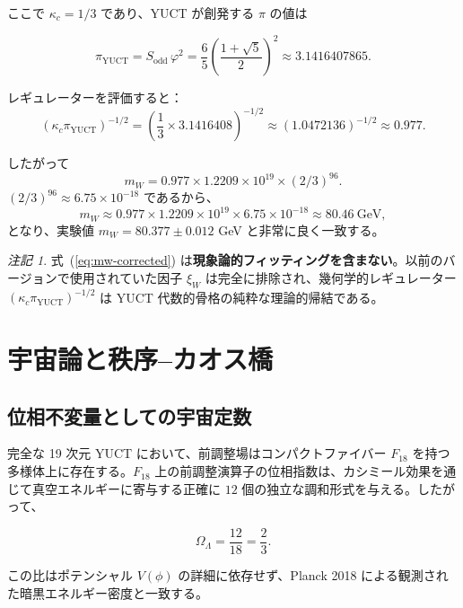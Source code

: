 \documentclass[12pt,a4paper]{article}
\theoremstyle{remark}
\newtheorem{remark}[theorem]{注記}
\begin{document}
	ここで \(\kappa_c = 1/3\) であり、YUCT が創発する \(\pi\) の値は
	
	\[
	\pi_{\mathrm{YUCT}} = S_{\mathrm{odd}} \, \varphi^2
	= \frac{6}{5} \left( \frac{1+\sqrt{5}}{2} \right)^2
	\approx 3.1416407865.
	\]
	
	レギュレーターを評価すると：
	\[
	\left( \kappa_c \pi_{\mathrm{YUCT}} \right)^{-1/2}
	= \left( \frac{1}{3} \times 3.1416408 \right)^{-1/2}
	\approx (1.0472136)^{-1/2} \approx 0.977.
	\]
	
	したがって
	\[
	m_W = 0.977 \times 1.2209 \times 10^{19} \times (2/3)^{96}.
	\]
	\((2/3)^{96} \approx 6.75 \times 10^{-18}\) であるから、
	\[
	m_W \approx 0.977 \times 1.2209 \times 10^{19} \times 6.75 \times 10^{-18}
	\approx 80.46\ \text{GeV},
	\]
	となり、実験値 \(m_W = 80.377 \pm 0.012\) GeV と非常に良く一致する。
	
	\begin{remark}
		式~(\ref{eq:mw-corrected}) は\textbf{現象論的フィッティングを含まない}。以前のバージョンで使用されていた因子 \(\xi_W\) は完全に排除され、幾何学的レギュレーター \((\kappa_c\pi_{\mathrm{YUCT}})^{-1/2}\) は YUCT 代数的骨格の純粋な理論的帰結である。
	\end{remark}
	
	\section{宇宙論と秩序--カオス橋}
	\label{sec:cosmology}
	
	\subsection{位相不変量としての宇宙定数}
	
	完全な 19 次元 YUCT において、前調整場はコンパクトファイバー \(F_{18}\) を持つ多様体上に存在する。\(F_{18}\) 上の前調整演算子の位相指数は、カシミール効果を通じて真空エネルギーに寄与する正確に \(12\) 個の独立な調和形式を与える。したがって、
	
	\begin{equation}
		\boxed{\Omega_\Lambda = \frac{12}{18} = \frac{2}{3}}.
		\label{eq:OmegaLambda}
	\end{equation}
	
	この比はポテンシャル \(V(\phi)\) の詳細に依存せず、Planck 2018 による観測された暗黒エネルギー密度と一致する。
	
\end{document}
